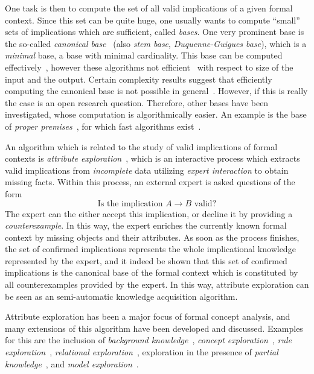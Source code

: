 One task is then to compute the set of all valid implications of a given formal context.
Since this set can be quite huge, one usually wants to compute \enquote{small} sets of
implications which are sufficient, called \emph{bases}.  One very prominent base is the
so-called \emph{canonical base}~\cite{fca:DuquenneGuigues:1986} (also \emph{stem base},
\emph{Duquenne-Guigues base}), which is a \emph{minimal} base, \ie a base with minimal
cardinality.  This base can be computed
effectively~\cite{DBLP:conf/icfca/Ganter10,DBLP:journals/amai/ObiedkovD07}, however these
algorithms not efficient~\cite{DBLP:conf/icfca/Distel10} with respect to size of the input
and the output.  Certain complexity results suggest that efficiently computing the
canonical base is not possible in general~\cite{DBLP:journals/dam/BabinK13}.  However, if
this is really the case is an open research question.  Therefore, other bases have been
investigated, whose computation is algorithmically easier.  An example is the base of
\emph{proper premises}~\cite{fca-book}, for which fast algorithms
exist~\cite{RyDiBo-AMAI13}.

An algorithm which is related to the study of valid implications of formal contexts is
\emph{attribute exploration}~\cite{fca-book,GORS-book}, which is an interactive process
which extracts valid implications from \emph{incomplete} data utilizing \emph{expert
  interaction} to obtain missing facts.  Within this process, an external expert is asked
questions of the form
\begin{equation*}
  \text{Is the implication } A \to B \text{ valid?}
\end{equation*}
The expert can the either accept this implication, or decline it by providing a
\emph{counterexample}.  In this way, the expert enriches the currently known formal
context by missing objects and their attributes.  As soon as the process finishes, the set
of confirmed implications represents the whole implicational knowledge represented by the
expert, and it indeed be shown that this set of confirmed implications is the canonical
base of the formal context which is constituted by all counterexamples provided by the
expert.  In this way, attribute exploration can be seen as an semi-automatic knowledge
acquisition algorithm.

Attribute exploration has been a major focus of formal concept analysis, and many
extensions of this algorithm have been developed and discussed.  Examples for this are the
inclusion of \emph{background
  knowledge}~\cite{stumme96attribute,DBLP:journals/tcs/Ganter99}, \emph{concept
  exploration}~\cite{conf/iccs/Stumme97}, \emph{rule
  exploration}~\cite{phd/de/Zickwolff1991}, \emph{relational
  exploration}~\cite{rudolph2006relational}, exploration in the presence of \emph{partial
  knowledge}~\cite{DBLP:conf/fca/BurmeisterH05,BGSS07}, and \emph{model
  exploration}~\cite{Diss-Felix}.

